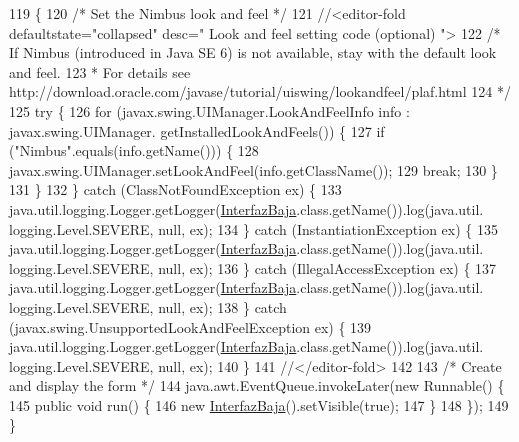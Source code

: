 \begin{DoxyCode}
119                                            \{
120         \textcolor{comment}{/* Set the Nimbus look and feel */}
121         \textcolor{comment}{//<editor-fold defaultstate="collapsed" desc=" Look and feel setting code (optional) ">}
122         \textcolor{comment}{/* If Nimbus (introduced in Java SE 6) is not available, stay with the default look and feel.}
123 \textcolor{comment}{         * For details see http://download.oracle.com/javase/tutorial/uiswing/lookandfeel/plaf.html }
124 \textcolor{comment}{         */}
125         \textcolor{keywordflow}{try} \{
126             \textcolor{keywordflow}{for} (javax.swing.UIManager.LookAndFeelInfo info : javax.swing.UIManager.
      getInstalledLookAndFeels()) \{
127                 \textcolor{keywordflow}{if} (\textcolor{stringliteral}{"Nimbus"}.equals(info.getName())) \{
128                     javax.swing.UIManager.setLookAndFeel(info.getClassName());
129                     \textcolor{keywordflow}{break};
130                 \}
131             \}
132         \} \textcolor{keywordflow}{catch} (ClassNotFoundException ex) \{
133             java.util.logging.Logger.getLogger(\mbox{\hyperlink{class_interfaz_package_1_1_interfaz_baja_a27932d334092f5a28a7cd3124c5e0ec1}{InterfazBaja}}.class.getName()).log(java.util.
      logging.Level.SEVERE, null, ex);
134         \} \textcolor{keywordflow}{catch} (InstantiationException ex) \{
135             java.util.logging.Logger.getLogger(\mbox{\hyperlink{class_interfaz_package_1_1_interfaz_baja_a27932d334092f5a28a7cd3124c5e0ec1}{InterfazBaja}}.class.getName()).log(java.util.
      logging.Level.SEVERE, null, ex);
136         \} \textcolor{keywordflow}{catch} (IllegalAccessException ex) \{
137             java.util.logging.Logger.getLogger(\mbox{\hyperlink{class_interfaz_package_1_1_interfaz_baja_a27932d334092f5a28a7cd3124c5e0ec1}{InterfazBaja}}.class.getName()).log(java.util.
      logging.Level.SEVERE, null, ex);
138         \} \textcolor{keywordflow}{catch} (javax.swing.UnsupportedLookAndFeelException ex) \{
139             java.util.logging.Logger.getLogger(\mbox{\hyperlink{class_interfaz_package_1_1_interfaz_baja_a27932d334092f5a28a7cd3124c5e0ec1}{InterfazBaja}}.class.getName()).log(java.util.
      logging.Level.SEVERE, null, ex);
140         \}
141         \textcolor{comment}{//</editor-fold>}
142 
143         \textcolor{comment}{/* Create and display the form */}
144         java.awt.EventQueue.invokeLater(\textcolor{keyword}{new} Runnable() \{
145             \textcolor{keyword}{public} \textcolor{keywordtype}{void} run() \{
146                 \textcolor{keyword}{new} \mbox{\hyperlink{class_interfaz_package_1_1_interfaz_baja_a27932d334092f5a28a7cd3124c5e0ec1}{InterfazBaja}}().setVisible(\textcolor{keyword}{true});
147             \}
148         \});
149     \}
\end{DoxyCode}



